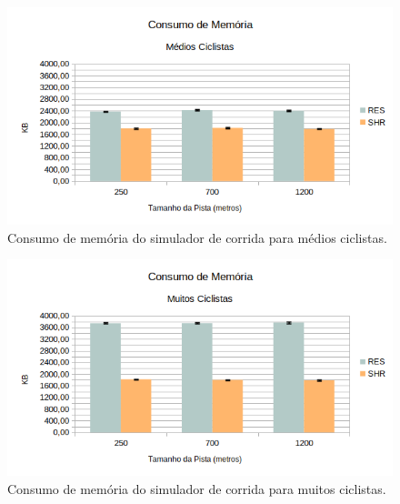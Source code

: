 \documentclass[12pt]{article}
\begin{document}
\begin{figure}
	\centering
	\includegraphics[width=1\textwidth]{cm_mc.png}
	\caption{Consumo de memória do simulador de corrida para médios ciclistas.}
	\label{fig:cm_mc}
\end{figure}

\begin{figure}
	\centering
	\includegraphics[width=1\textwidth]{cm_mmc.png}
	\caption{Consumo de memória do simulador de corrida para muitos ciclistas.}
	\label{fig:cm_mmc}
\end{figure}


\clearpage



\end{document}
